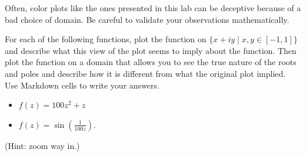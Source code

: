 \begin{warn}
Often, color plots like the ones presented in this lab can be deceptive because of a bad choice of domain.
Be careful to validate your observations mathematically.
\end{warn}

\begin{problem}
For each of the following functions, plot the function on $\{x+iy\mid x,y\in[-1,1]\}$ and describe what this view of the plot seems to imply about the function.
Then plot the function on a domain that allows you to see the true nature of the roots and poles and describe how it is different from what the original plot implied.
Use Markdown cells to write your answers.
\begin{itemize}
\item $f(z) = 100z^2 + z$
\item $f(z) = \sin\left(\frac{1}{100z}\right)$.
\end{itemize}
(Hint: zoom way in.)
\end{problem}


